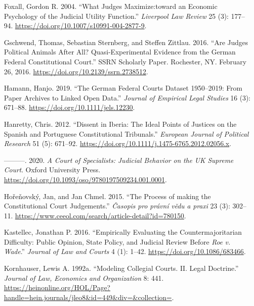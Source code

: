\documentclass[
  11pt,
]{article}
\newlength{\cslhangindent}
\newenvironment{CSLReferences}[2] %
 {%
  \setlength{\parindent}{0pt}
  \ifodd #1 \everypar{\setlength{\hangindent}{\cslhangindent}}\ignorespaces\fi
  \ifnum #2 > 0
  \setlength{\parskip}{#2\baselineskip}
  \fi
 }%
 {}
\begin{document}
\begin{CSLReferences}{1}{0}
\leavevmode{}%
Foxall, Gordon R. 2004. {``What Judges Maximize:toward an Economic
Psychology of the Judicial Utility Function.''} \emph{Liverpool Law
Review} 25 (3): 177--94.
\url{https://doi.org/10.1007/s10991-004-2877-9}.

\leavevmode{}%
Gschwend, Thomas, Sebastian Sternberg, and Steffen Zittlau. 2016. {``Are
{Judges Political Animals} After {All}? {Quasi-Experimental Evidence}
from the {German Federal Constitutional Court}.''} SSRN Scholarly Paper.
{Rochester, NY}. February 26, 2016.
\url{https://doi.org/10.2139/ssrn.2738512}.

\leavevmode{}%
Hamann, Hanjo. 2019. {``The {German Federal Courts Dataset} 1950--2019:
{From Paper Archives} to {Linked Open Data}.''} \emph{Journal of
Empirical Legal Studies} 16 (3): 671--88.
\url{https://doi.org/10.1111/jels.12230}.

\leavevmode{}%
Hanretty, Chris. 2012. {``Dissent in {Iberia}: {The} Ideal Points of
Justices on the {Spanish} and {Portuguese Constitutional Tribunals}.''}
\emph{European Journal of Political Research} 51 (5): 671--92.
\url{https://doi.org/10.1111/j.1475-6765.2012.02056.x}.

\leavevmode{}%
---------. 2020. \emph{A {Court} of {Specialists}: {Judicial Behavior}
on the {UK Supreme Court}}. {Oxford University Press}.
\url{https://doi.org/10.1093/oso/9780197509234.001.0001}.

\leavevmode{}%
Hořeňovský, Jan, and Jan Chmel. 2015. {``The Process of making the
Constitutional Court Judgements.''} \emph{Časopis pro právní vědu a
praxi} 23 (3): 302--11.
\url{https://www.ceeol.com/search/article-detail?id=780150}.

\leavevmode{}%
Kastellec, Jonathan P. 2016. {``Empirically {Evaluating} the
{Countermajoritarian Difficulty}: {Public Opinion}, {State Policy}, and
{Judicial Review} Before {\emph{Roe}}{ \emph{v.} }{\emph{Wade}}.''}
\emph{Journal of Law and Courts} 4 (1): 1--42.
\url{https://doi.org/10.1086/683466}.

\leavevmode{}%
Kornhauser, Lewis A. 1992a. {``Modeling {Collegial Courts}. {II}. {Legal
Doctrine}.''} \emph{Journal of Law, Economics and Organization} 8: 441.
\url{https://heinonline.org/HOL/Page?handle=hein.journals/jleo8&id=449&div=&collection=}.


\end{CSLReferences}
\end{document}
